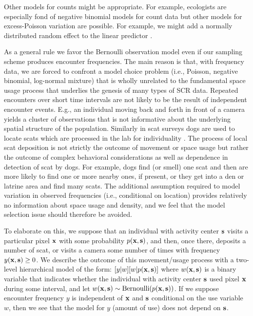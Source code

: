 Other models for counts might be appropriate. For example, ecologists
are especially fond of negative binomial models for count data
\citep{verhoef_boveng:2007,white_bennetts:1996,kery_etal:2005}
but other models for excess-Poisson variation are possible. For
example, we might add a normally distributed random effect to
the linear predictor \citep{coull_agresti:1999}.

As a general rule we favor the Bernoulli observation model even if
our sampling scheme produces encounter frequencies. The main reason is
that, with frequency data, we are forced to confront a model choice
problem (i.e., Poisson, negative binomial, log-normal mixture) that is
wholly unrelated to the fundamental space usage process that underlies
the genesis  %
of many types of SCR data.  Repeated encounters over short time
intervals are not likely to be the result of independent encounter
events. E.g., an individual moving back and forth in front of a camera
yields a cluster of observations that is not informative about the
underlying spatial structure of the population. Similarly in scat
surveys dogs are used to locate scats which are processed in the lab
for individuality \citep{kohn_etal:1999, mackay_etal:2008,
  thompson_etal:2012}.  The process of local scat deposition is not
strictly the outcome of movement or space usage but rather the outcome
of complex behavioral considerations as well as dependence in
detection of scat by dogs.  For example, dogs find (or smell) one scat
and then are more likely to find one or more nearby ones, if present,
or they get into a den or latrine area and find many scats.  The
additional assumption required to model variation in observed
frequencies (i.e., conditional on location) provides relatively no
information about space usage and density, and we feel that the model
selection issue should therefore be avoided.

To elaborate on this, we suppose that an individual with activity
center ${\bf s}$ visits a
particular pixel ${\bf x}$
with some probability $p({\bf x}, {\bf
  s})$, and then, once there, deposits a number of scat, or visits
a camera some number of times with frequency $y({\bf x},{\bf s}) \ge
0$.  We describe the outcome of this movement/usage process with a two-level
hierarchical model of the form: $[y|w][w|p({\bf x},{\bf s})]$ where
$w({\bf x},{\bf s})$ is a binary variable that indicates whether the
individual with activity center ${\bf s}$ used pixel ${\bf x}$
during some interval, and let $w({\bf x},{\bf s}) \sim
\mbox{Bernoulli}(p({\bf x},{\bf s}))$. If we suppose  encounter frequency
$y$ is independent of ${\bf x}$ and ${\bf s}$ conditional on the
use variable  $w$, then  we see that
the model for $y$ (amount of use) does not depend on ${\bf s}$.


